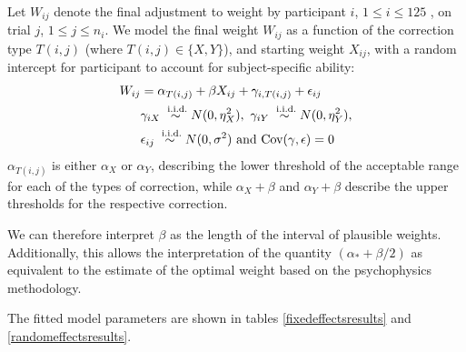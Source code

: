 \documentclass[11pt]{isuthesis}\usepackage[]{graphicx}\usepackage[]{color}
\begin{document}
Let $W_{ij}$ denote the final adjustment to weight by participant $i$, $ 1 \le i \le 125$ , on trial $j$, $1 \le j \le n_i$. 
We model the final weight $W_{ij}$ as a function of the correction type $T(i,j)$  (where $T(i,j) \in  \{X, Y\}$), and starting weight $X_{ij}$, with a random intercept for participant to account for subject-specific ability: 
\begin{align}\label{model1}
W_{ij} &= \alpha_{T(i,j)} + \beta X_{ij} + \gamma_{i, T(i,j)} + \epsilon_{ij}\\
& \gamma_{iX} \stackrel{\text{ i.i.d.}}{\sim} N(0, \eta_X^2) , \ \gamma_{iY} \stackrel{\text{ i.i.d.}}{\sim} N(0, \eta_Y^2) ,\notag  \\
& \epsilon_{ij} \stackrel{\text{ i.i.d.}}{\sim} N(0, \sigma^2)  \text{ and } \text{Cov}(\gamma, \epsilon) = 0\notag 
\end{align}
 $\alpha_{T(i,j)}$ is either $\alpha_X$ or $\alpha_Y$, describing the lower threshold of the acceptable range for each of the types of correction, while $\alpha_X+\beta$ and $\alpha_Y + \beta$ describe the upper thresholds for the respective correction.

We can therefore interpret $\beta$ as the length of the interval of plausible weights. Additionally, this allows the interpretation of the quantity $(\alpha_* + \beta/2)$ as equivalent to the estimate of the optimal weight based on the psychophysics methodology.

\noindent
The fitted model parameters are shown in tables \ref{fixedeffectsresults} and \ref{randomeffectsresults}. 
\end{document}
